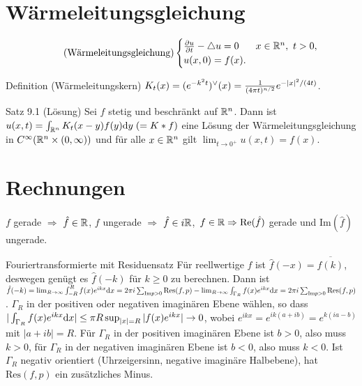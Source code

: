 \section{Wärmeleitungsgleichung}
\begin{align*}
  \tag{Wärmeleitungsgleichung}
  \begin{cases}
    \frac{\partial u}{\partial t} - \triangle u = 0 &  x\in\mathbb{R}^n,\ t > 0, \\
    u(x,0) = f(x).
  \end{cases}
\end{align*}

\begin{namedtheorem}{Definition (Wärmeleitungskern)}
  $K_t(x) = (e^{-k^2t}){}^{\vee}(x) = \frac{1}{(4\pi t)^{n/2}}e^{-|x|^2/(4t)}$.
\end{namedtheorem}

\begin{namedtheorem}{Satz 9.1 (Lösung)}
  Sei $f$ stetig und beschränkt auf $\mathbb{R}^n$. Dann ist $u(x,t) = \int_{\mathbb{R}^n}K_t(x-y)f(y)\mathrm{d} y \; (=K \ast f)$ eine Lösung der Wärmeleitungsgleichung in $C^{\infty}(\mathbb{R}^n\times(0,\infty))$ und für alle $x\in\mathbb{R}^n$ gilt $\lim_{t\rightarrow0^{+}} u(x,t) = f(x)$.
\end{namedtheorem}

\section{Rechnungen}


$f$ gerade $\Rightarrow$ $\hat{f}\in \mathbb{R}$, $f$ ungerade $\Rightarrow$ $\hat{f}\in i\mathbb{R}$,\  $f \in \mathbb{R} \Rightarrow \mathrm{Re}(\hat{f})$ gerade und $\mathrm{Im}(\hat{f})$ ungerade. 

\begin{namedtheorem}{Fouriertransformierte mit Residuensatz}
Für reellwertige $f$ ist $\hat{f}(-x)=\overline{\hat{f}(k)}$, deswegen genügt es $\hat{f}(-k)$ für $k\geq0$ zu berechnen. Dann ist $\hat{f}(-k)=\lim_{R\rightarrow\infty}\int_{-R}^R f(x)e^{ikx}\mathrm{d}x = 2\pi i\sum_{\mathrm{Im}p>0} \mathrm{Res}(f,p) - \lim_{R\rightarrow\infty}\int_{\Gamma_R}f(x)e^{ikx}\mathrm{d}x = 2\pi i\sum_{\mathrm{Im}p>0} \mathrm{Res}(f,p)$. $\Gamma_R$ in der positiven oder negativen imaginären Ebene wählen, so dass $|\int_{\Gamma_R}f(x)e^{ikx}\mathrm{d}x|\leq\pi R\sup_{|x|=R}|f(x)e^{ikx}|\rightarrow0$, wobei $e^{ikx}=e^{ik(a+ib)}=e^{k(ia-b)}$ mit $|a+ib|=R$. Für $\Gamma_R$ in der positiven imaginären Ebene ist $b>0$, also muss $k>0$, für $\Gamma_R$ in der negativen imaginären Ebene ist $b<0$, also muss $k<0$. Ist $\Gamma_R$ negativ orientiert (Uhrzeigersinn, negative imaginäre Halbebene), hat $\mathrm{Res}(f,p)$ ein zusätzliches Minus.
\end{namedtheorem}


